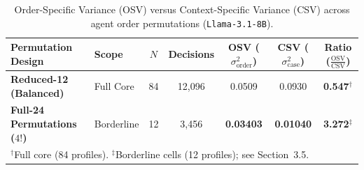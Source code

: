 \begin{table}[htb]
\centering
\caption{Order-Specific Variance (OSV) versus Context-Specific Variance (CSV) across agent order permutations (\texttt{Llama-3.1-8B}).}
\label{tab:variance_decomposition}
\vspace{2pt}
\footnotesize
\setlength{\tabcolsep}{3.5pt}
\begin{tabular}{@{}llccccc@{}}
\toprule
\textbf{Permutation Design} & \textbf{Scope} & \textbf{$N$} & \textbf{Decisions} & \textbf{OSV} ($\sigma^2_{\text{order}}$) & \textbf{CSV} ($\sigma^2_{\text{case}}$) & \textbf{Ratio ($\frac{\text{OSV}}{\text{CSV}}$)} \\
\midrule
\textbf{Reduced-12 (Balanced)} & Full Core & 84 & 12,096 & 0.0509 & 0.0930 & \textbf{0.547}$^\dagger$ \\
\textbf{Full-24 Permutations ($4!$)} & Borderline & 12 & 3,456 & \textbf{0.03403} & \textbf{0.01040} & \textbf{3.272}$^\ddagger$ \\
\bottomrule
\multicolumn{7}{l}{\vspace{2pt}\footnotesize $^\dagger$Full core (84 profiles). $^\ddagger$Borderline cells (12 profiles); see Section~3.5.}
\end{tabular}
\end{table}
